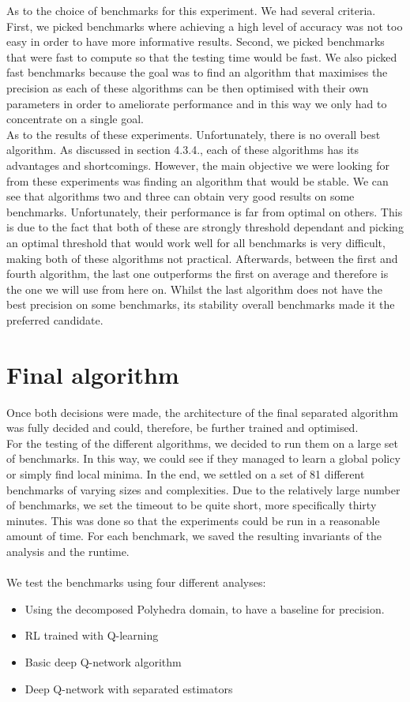 As to the choice of benchmarks for this experiment. We had several criteria. First, we picked benchmarks where achieving a high level of accuracy was not too easy in order to have more informative results. Second, we picked benchmarks that were fast to compute so that the testing time would be fast. We also picked fast benchmarks because the goal was to find an algorithm that maximises the precision as each of these algorithms can be then optimised with their own parameters in order to ameliorate performance and in this way we only had to concentrate on a single goal.\\
As to the results of these experiments. Unfortunately, there is no overall best algorithm. As discussed in section 4.3.4., each of these algorithms has its advantages and shortcomings. However, the main objective we were looking for from these experiments was finding an algorithm that would be stable. We can see that algorithms two and three can obtain very good results on some benchmarks. Unfortunately, their performance is far from optimal on others. This is due to the fact that both of these are strongly threshold dependant and picking an optimal threshold that would work well for all benchmarks is very difficult, making both of these algorithms not practical. Afterwards, between the first and fourth algorithm, the last one outperforms the first on average and therefore is the one we will use from here on. Whilst the last algorithm does not have the best precision on some benchmarks, its stability overall benchmarks made it the preferred candidate.


\section{Final algorithm}
Once both decisions were made, the architecture of the final separated algorithm was fully decided and could, therefore, be further trained and optimised.\\
For the testing of the different algorithms, we decided to run them on a large set of benchmarks. In this way, we could see if they managed to learn a global policy or simply find local minima. In the end, we settled on a set of 81 different benchmarks of varying sizes and complexities. Due to the relatively large number of benchmarks, we set the timeout to be quite short, more specifically thirty minutes. This was done so that the experiments could be run in a reasonable amount of time. For each benchmark, we saved the resulting invariants of the analysis and the runtime.\\
\mbox{}\\
We test the benchmarks using four different analyses:
\begin{itemize}
    \item Using the decomposed Polyhedra domain, to have a baseline for precision.
    \item RL trained with Q-learning
    \item Basic deep Q-network algorithm
    \item Deep Q-network with separated estimators
\end{itemize}

